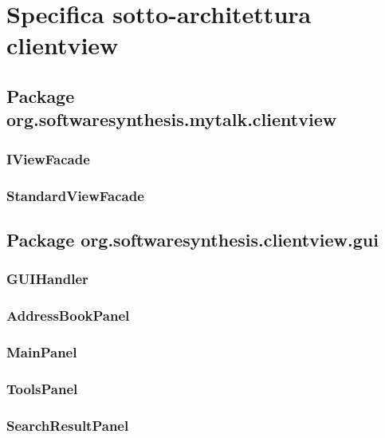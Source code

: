 \section{Specifica sotto-architettura clientview}\label{sec:clientviewarchitecture}

\subsection{Package org.softwaresynthesis.mytalk.clientview}\label{sec:clientview}

\subsubsection{IViewFacade}\label{sec:iviewfacade}

\subsubsection{StandardViewFacade}\label{sec:standardviewfacade}

\subsection{Package org.softwaresynthesis.clientview.gui}\label{sec:gui}

\subsubsection{GUIHandler}\label{sec:guihandler}

\subsubsection{AddressBookPanel}\label{sec:addressbookpanel}

\subsubsection{MainPanel}\label{sec:mainpanel}

\subsubsection{ToolsPanel}\label{sec:toolspanel}

\subsubsection{SearchResultPanel}\label{sec:searchresultpanel}

